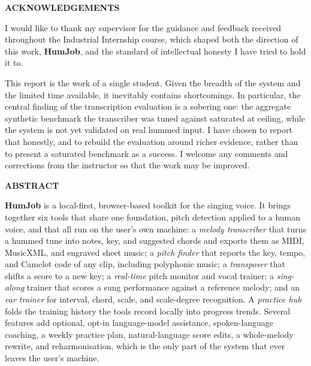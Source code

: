 \documentclass[12pt,a4paper]{article}
\begin{document}
\newpage
\begin{center}
    \textbf{\large ACKNOWLEDGEMENTS}
\end{center}

I would like to thank my supervisor for the guidance and feedback received
throughout the Industrial Internship course, which shaped both the direction of this work,
\textbf{HumJob}, and the standard of intellectual honesty I have tried to hold
it to.

This report is the work of a single student. Given the breadth of the system
and the limited time available, it inevitably contains shortcomings. In
particular, the central finding of the transcription evaluation is a sobering
one: the aggregate synthetic benchmark the transcriber was tuned against
saturated at ceiling, while the system is not yet validated on real hummed input.
I have chosen to report that honestly, and to rebuild the evaluation around richer
evidence, rather than to present a saturated benchmark as a success. I welcome any
comments and corrections from the instructor so that the work may be improved.

\newpage
\begin{center}
    \textbf{\large ABSTRACT}
\end{center}

\textbf{HumJob} is a local-first, browser-based toolkit for the singing voice.
It brings together six tools that share one foundation, pitch detection applied
to a human voice, and that all run on the user's own machine: a \emph{melody
transcriber} that turns a hummed tune into notes, key, and suggested chords and
exports them as MIDI, MusicXML, and engraved sheet music; a \emph{pitch finder}
that reports the key, tempo, and Camelot code of any clip, including polyphonic
music; a \emph{transposer} that shifts a score to a new key; a \emph{real-time}
pitch monitor and vocal trainer; a \emph{sing-along} trainer that scores a sung
performance against a reference melody; and an \emph{ear trainer} for interval,
chord, scale, and scale-degree recognition. A \emph{practice hub} folds the
training history the tools record locally into progress trends. Several features
add optional, opt-in language-model assistance, spoken-language coaching, a
weekly practice plan, natural-language score edits, a whole-melody rewrite, and
reharmonisation, which is the only part of the system that ever leaves the user's
machine.
\end{document}
